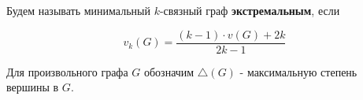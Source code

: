 










\begin{df*}
	Будем называть минимальный $k$-связный граф \textbf{экстремальным}, если 

	 \[
		v_k(G) = \frac{(k - 1) \cdot v(G) + 2k}{2k - 1}
	\] 
\end{df*}

\begin{prop*}[$\triangle$]
	Для произвольного графа  $G$ обозначим  $\triangle(G)$ - максимальную степень вершины в  $G$.
\end{prop*}

